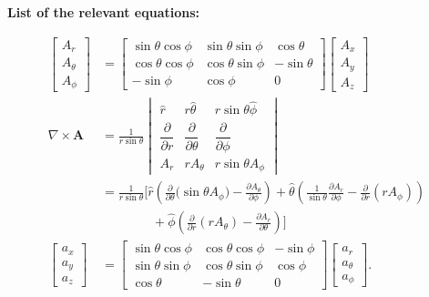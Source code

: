 \begin{center}
\textbf{List of the relevant equations:}

\[
\begin{aligned}
\begin{bmatrix}
A_r \\
A_{\theta} \\
A_{\phi}
\end{bmatrix}
&=
\begin{bmatrix}
\sin\theta \cos\phi & \sin\theta \sin\phi & \cos\theta \\
\cos\theta \cos\phi & \cos\theta \sin\phi & -\sin\theta \\
-\sin\phi & \cos\phi & 0
\end{bmatrix}
\begin{bmatrix}
A_x \\
A_y \\
A_z
\end{bmatrix} \\[1.5em]
\nabla \times \mathbf{A}
&=
\frac{1}{r \sin\theta}
\begin{vmatrix}
\hat{r} & r \hat{\theta} & r \sin\theta \hat{\phi} \\
\dfrac{\partial}{\partial r} & \dfrac{\partial}{\partial \theta} & \dfrac{\partial}{\partial \phi} \\
A_r & r A_\theta & r \sin\theta A_\phi
\end{vmatrix} \\[1.2em]
&=
\frac{1}{r \sin\theta}
\Bigg[
\hat{r} \left(
\frac{\partial}{\partial \theta}\!\big(\sin\theta A_\phi\big) -
\frac{\partial A_\theta}{\partial \phi}
\right)
+ \hat{\theta} \left(
\frac{1}{\sin\theta}\frac{\partial A_r}{\partial \phi} -
\frac{\partial}{\partial r}(r A_\phi)
\right) \\
&\qquad\qquad
+ \hat{\phi} \left(
\frac{\partial}{\partial r}(r A_\theta) -
\frac{\partial A_r}{\partial \theta}
\right)
\Bigg] \\[1.5em]
\begin{bmatrix}
a_x \\
a_y \\
a_z
\end{bmatrix}
&=
\begin{bmatrix}
\sin\theta \cos\phi & \cos\theta \cos\phi & -\sin\phi \\
\sin\theta \sin\phi & \cos\theta \sin\phi & \cos\phi \\
\cos\theta           & -\sin\theta          & 0
\end{bmatrix}
\begin{bmatrix}
a_r \\
a_{\theta} \\
a_{\phi}
\end{bmatrix}.
\end{aligned}
\]



\end{center}